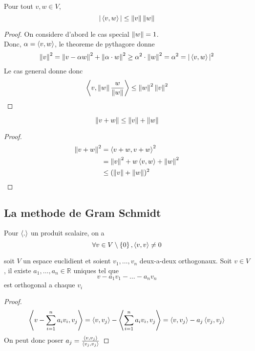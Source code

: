 \documentclass[../main.tex]{subfiles}
\begin{document}
\begin{thm}
Pour tout $v,w \in V$,
\[ 
| \left\langle v,w\right\rangle | \leq \left\lVert v\right\rVert \left\lVert w\right\rVert
\]

\end{thm}
\begin{proof}
On considere d'abord le cas special $\left\lVert w\right\rVert =1$.\\
Donc, $\alpha= \left\langle v,w\right\rangle$, le theoreme de pythagore donne
\begin{align*}
\left\lVert v\right\rVert ^{2} = \left\lVert v- \alpha w\right\rVert ^{2} + \left\lVert \alpha \cdot  w  \right\rVert^{2} \geq \alpha^{2} \cdot \left\lVert w\right\rVert ^{2} = \alpha^{2} = | \left\langle v,w\right\rangle |^{2}
\end{align*}
Le cas general donne donc
\[ 
\left\langle v, \left\lVert w\right\rVert \frac{w}{\left\lVert w\right\rVert}\right\rangle \leq \left\lVert w\right\rVert ^{2} \left\lVert v\right\rVert ^{2}
\]

\end{proof}
\begin{thm}
	\[ 
	\left\lVert v+w\right\rVert \leq \left\lVert v\right\rVert + \left\lVert w\right\rVert
	\]
\end{thm}
\begin{proof}
	\begin{align*}
		\left\lVert v+w\right\rVert ^{2} &= \left\langle v+w, v+w\right\rangle ^{2}\\
			       &= \left\lVert v\right\rVert ^{2}+ w \left\langle v,w\right\rangle  + \left\lVert w\right\rVert ^{2}\\
			       &\leq (\left\lVert v\right\rVert + \left\lVert w\right\rVert ) ^{2}
	\end{align*}
\end{proof}
\subsection{La methode de Gram Schmidt}
Pour $\left\langle.\right\rangle$ un produit scalaire, on a 
\[ 
\forall v \in V \setminus \left\{ 0 \right\} , \left\langle v,v\right\rangle \neq 0
\]
\begin{lemma}
soit $V$ un espace euclidient et soient $v_1, \ldots, v_n$ deux-a-deux orthogonaux. Soit $v \in V$, il existe $a_1, \ldots, a_n \in \mathbb{R}$ uniques tel que
\[ 
v - a_1v_1 - \ldots - a_n v_n
\]
est orthogonal a chaque $v_i$
\end{lemma}
\begin{proof}
\[ 
\left\langle v - \sum_{i=1}^{ n}a_i v_i, v_j\right\rangle = \left\langle v,v_j\right\rangle - \left\langle  \sum_{i=1}^{ n}a_i v_i,v_j\right\rangle = \left\langle v,v_j\right\rangle - a_j \left\langle v_j,v_j\right\rangle 
\]
On peut donc poser $a_j = \frac{\left\langle v,v_j\right\rangle }{\left\langle v_j,v_j\right\rangle } $

\end{proof}
\end{document}
